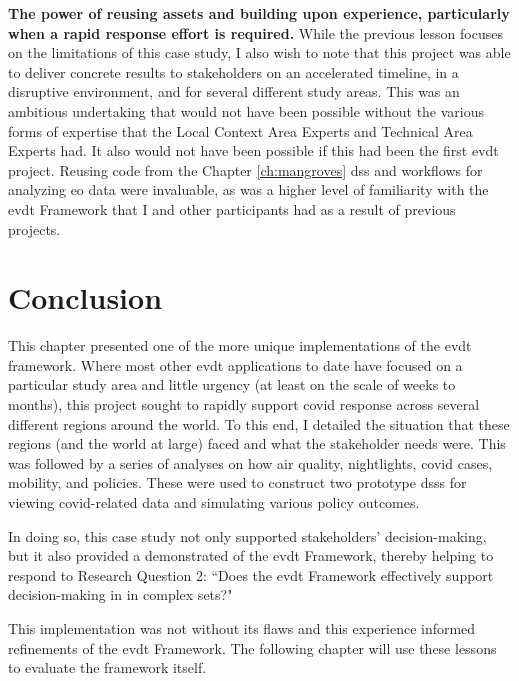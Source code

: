 \textbf{The power of reusing assets and building upon experience, particularly when a rapid response effort is required.} While the previous lesson focuses on the limitations of this case study, I also wish to note that this project was able to deliver concrete results to stakeholders on an accelerated timeline, in a disruptive environment, and for several different study areas. This was an ambitious undertaking that would not have been possible without the various forms of expertise that the Local Context Area Experts and Technical Area Experts had. It also would not have been possible if this had been the first \ac{evdt} project. Reusing code from the Chapter \ref{ch:mangroves} \ac{dss} and workflows for analyzing \ac{eo} data were invaluable, as was a higher level of familiarity with the \ac{evdt} Framework that I and other participants had as a result of previous projects.


\section{Conclusion} \label{sec:vida-concl}

This chapter presented one of the more unique implementations of the \ac{evdt} framework. Where most other \ac{evdt} applications to date have focused on a particular study area and little urgency (at least on the scale of weeks to months), this project sought to rapidly support \ac{covid} response across several different regions around the world. To this end, I detailed the situation that these regions (and the world at large) faced and what the stakeholder needs were. This was followed by a series of analyses on how air quality, nightlights, \ac{covid} cases, mobility, and policies. These were used to construct two prototype \acp{dss} for viewing \ac{covid}-related data and simulating various policy outcomes.

In doing so, this case study not only supported stakeholders' decision-making, but it also provided a demonstrated of the \ac{evdt} Framework, thereby helping to respond to Research Question 2: ``Does the \ac{evdt} Framework effectively support decision-making in in complex \ac{sets}?"

This implementation was not without its flaws and this experience informed refinements of the \ac{evdt} Framework. The following chapter will use these lessons to evaluate the framework itself.


